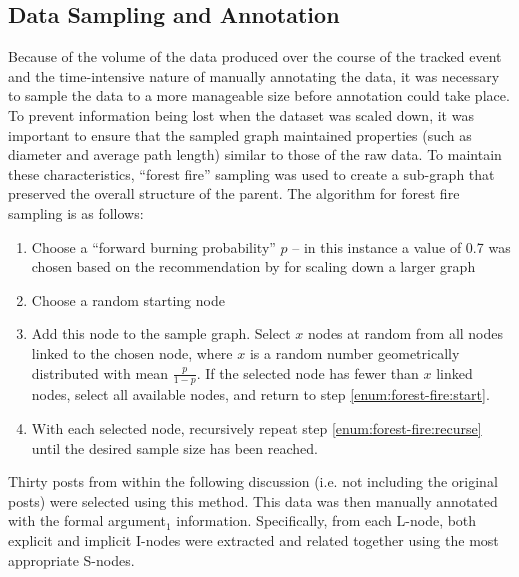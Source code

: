 \subsection{Data Sampling and Annotation}
\label{method:annotation}
Because of the volume of the data produced over the course of the tracked event and the time-intensive nature of manually annotating the data, it was necessary to sample the data to a more manageable size before annotation could take place. To prevent information being lost when the dataset was scaled down, it was important to  ensure that the sampled graph maintained properties (such as diameter and average path length) similar to those of the raw data. To maintain these characteristics, ``forest fire'' sampling \citep{leskovec2005graphs, leskovec2006sampling} was used to create a sub-graph that preserved the overall structure of the parent. The algorithm for forest fire sampling is as follows:
\begin{enumerate}
\item Choose a ``forward burning probability'' $p$ -- in this instance a value of 0.7 was chosen based on the recommendation by \citet{leskovec2006sampling} for scaling down a larger graph

\item Choose a random starting node
\label{enum:forest-fire:start}

\item Add this node to the sample graph. Select $x$ nodes at random from all nodes linked to the chosen node, where $x$ is a random number geometrically distributed with mean $\frac{p}{1-p}$. If the selected node has fewer than $x$ linked nodes, select all available nodes, and return to step \ref{enum:forest-fire:start}.
\label{enum:forest-fire:recurse}

\item With each selected node, recursively repeat step \ref{enum:forest-fire:recurse} until the desired sample size has been reached. 
\end{enumerate}

Thirty posts from within the following discussion (i.e. not including the original posts) were selected using this method. This data was then manually annotated with the formal argument$_1$ information. Specifically, from each L-node, both explicit and implicit I-nodes were extracted and related together using the most appropriate S-nodes. %

